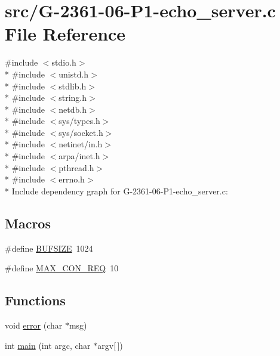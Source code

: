 \hypertarget{_g-2361-06-_p1-echo__server_8c}{}\section{src/\+G-\/2361-\/06-\/\+P1-\/echo\+\_\+server.c File Reference}
\label{_g-2361-06-_p1-echo__server_8c}
{\ttfamily \#include $<$stdio.\+h$>$}\\*
{\ttfamily \#include $<$unistd.\+h$>$}\\*
{\ttfamily \#include $<$stdlib.\+h$>$}\\*
{\ttfamily \#include $<$string.\+h$>$}\\*
{\ttfamily \#include $<$netdb.\+h$>$}\\*
{\ttfamily \#include $<$sys/types.\+h$>$}\\*
{\ttfamily \#include $<$sys/socket.\+h$>$}\\*
{\ttfamily \#include $<$netinet/in.\+h$>$}\\*
{\ttfamily \#include $<$arpa/inet.\+h$>$}\\*
{\ttfamily \#include $<$pthread.\+h$>$}\\*
{\ttfamily \#include $<$errno.\+h$>$}\\*
Include dependency graph for G-\/2361-\/06-\/\+P1-\/echo\+\_\+server.c\+:
\subsection*{Macros}
\begin{DoxyCompactItemize}
\item 
\#define \hyperlink{_g-2361-06-_p1-echo__server_8c_aeca034f67218340ecb2261a22c2f3dcd}{B\+U\+F\+S\+I\+ZE}~1024
\item 
\#define \hyperlink{_g-2361-06-_p1-echo__server_8c_a3e4b4faa36cc9e3a7d9895aec8f27592}{M\+A\+X\+\_\+\+C\+O\+N\+\_\+\+R\+EQ}~10
\end{DoxyCompactItemize}
\subsection*{Functions}
\begin{DoxyCompactItemize}
\item 
void \hyperlink{_g-2361-06-_p1-echo__server_8c_aad9796c174f7ef5d226cd169f2520fd5}{error} (char $\ast$msg)
\item 
int \hyperlink{_g-2361-06-_p1-echo__server_8c_a0ddf1224851353fc92bfbff6f499fa97}{main} (int argc, char $\ast$argv\mbox{[}$\,$\mbox{]})
\end{DoxyCompactItemize}


